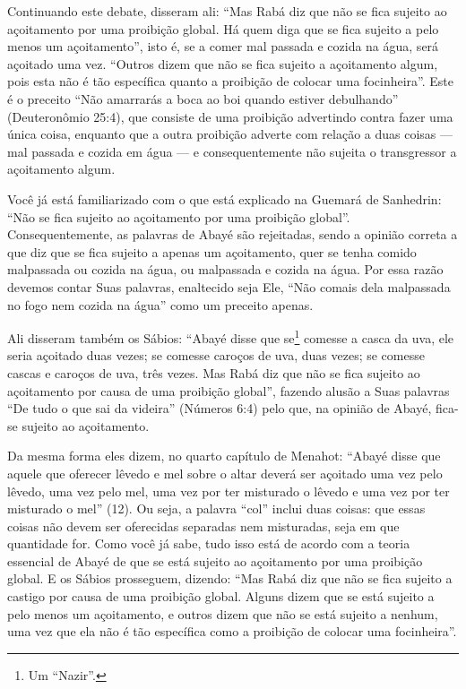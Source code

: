Continuando este debate, disseram ali: ``Mas Rabá diz que não se fica
sujeito ao açoitamento por uma proibição global. Há quem diga que se
fica sujeito a pelo menos um açoitamento'', isto é, se a comer mal
passada e cozida na água, será açoitado uma vez. ``Outros dizem que não
se fica sujeito a açoitamento algum, pois esta não é tão específica
quanto a proibição de colocar uma focinheira''. Este é o preceito ``Não
amarrarás a boca ao boi quando estiver debulhando'' (Deuteronômio
25:4), que consiste de uma proibição advertindo contra fazer uma única
coisa, enquanto que a outra proibição adverte com relação a duas coisas
--- mal passada e cozida em água --- e consequentemente não sujeita o
transgressor a açoitamento algum.


Você já está familiarizado com o que está explicado na Guemará de
Sanhedrin: ``Não se fica sujeito ao açoitamento por uma proibição
global''. Consequentemente, as palavras de Abayé são rejeitadas, sendo
a opinião correta a que diz que se fica sujeito a apenas um açoitamento,
quer se tenha comido malpassada ou cozida na água, ou malpassada e
cozida na água. Por essa razão devemos contar Suas palavras, enaltecido
seja Ele, ``Não comais dela malpassada no fogo nem cozida na água''
como um preceito apenas.

Ali disseram também os Sábios: ``Abayé disse que se\footnote{Um ``Nazir''.}
comesse a casca da uva, ele seria açoitado duas vezes; se comesse
caroços de uva, duas vezes; se comesse cascas e caroços de uva, três
vezes. Mas Rabá diz que não se fica sujeito ao açoitamento por causa de
uma proibição global'', fazendo alusão a Suas palavras ``De tudo o que
sai da videira'' (Números 6:4) pelo que, na opinião de Abayé, fica-se
sujeito ao açoitamento.

Da mesma forma eles dizem, no quarto capítulo de Menahot: ``Abayé disse
que aquele que oferecer lêvedo e mel sobre o altar deverá ser açoitado
uma vez pelo lêvedo, uma vez pelo mel, uma vez por ter misturado o
lêvedo e uma vez por ter misturado o mel'' (12). Ou seja, a palavra
``col'' inclui duas coisas: que essas coisas não devem ser oferecidas
separadas nem misturadas, seja em que quantidade for. Como você já sabe,
tudo isso está de acordo com a teoria essencial de Abayé de que se está
sujeito ao açoitamento por uma proibição global. E os Sábios
prosseguem, dizendo: ``Mas Rabá diz que não se fica sujeito a castigo
por causa de uma proibição global. Alguns dizem que se está sujeito a
pelo menos um açoitamento, e outros dizem que não se está sujeito a
nenhum, uma vez que ela não é tão específica como a proibição de colocar
uma focinheira''.

